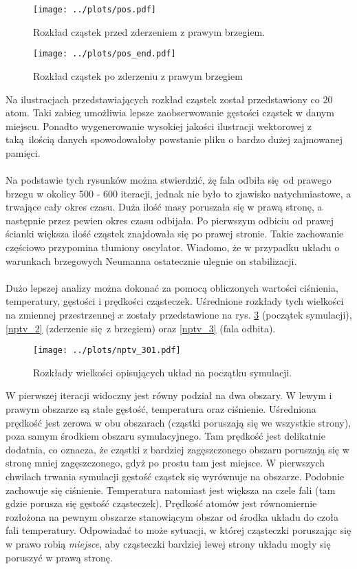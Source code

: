 \documentclass[a4paper, 12pt]{article}
\begin{document}
	\begin{figure}[H]
		\centering
		\texttt{[image: ../plots/pos.pdf]}
		\caption{Rozkład cząstek przed zderzeniem z prawym brzegiem.}
		\label{loc_1}
	\end{figure}
	
	\begin{figure}[H]
		\centering
		\texttt{[image: ../plots/pos\_end.pdf]}
		\caption{Rozkład cząstek po zderzeniu z prawym brzegiem}
		\label{loc_2}
	\end{figure}
	
	\noindent Na ilustracjach przedstawiających rozkład cząstek został przedstawiony co 20 atom. 
	Taki zabieg umożliwia lepsze zaobserwowanie gęstości cząstek w danym miejscu.
	Ponadto wygenerowanie wysokiej jakości ilustracji wektorowej z taką ilością danych spowodowałoby powstanie pliku o bardzo dużej zajmowanej pamięci.
	\\
	\\
	Na podstawie tych rysunków można stwierdzić, żę fala odbiła się od prawego brzegu w okolicy 500 - 600 iteracji, jednak nie było to zjawisko natychmiastowe, a trwające cały okres czasu.
	Duża ilość masy poruszała się w prawą stronę, a następnie przez pewien okres czasu odbijała.
	Po pierwszym odbiciu od prawej ścianki większa ilość cząstek znajdowała się po prawej stronie.
	Takie zachowanie częściowo przypomina tłumiony oscylator.
	Wiadomo, że w przypadku układu o warunkach brzegowych Neumanna ostatecznie ulegnie on stabilizacji.
	\\
	\\
	Dużo lepszej analizy można dokonać za pomocą obliczonych wartości ciśnienia, temperatury, gęstości i prędkości cząsteczek.
	Uśrednione rozkłady tych wielkości na zmiennej przestrzennej $x$ zostały przedstawione na rys. \ref{nptv_1} (początek symulacji), \ref{nptv_2} (zderzenie się z brzegiem) oraz \ref{nptv_3} (fala odbita).
	
	\begin{figure}[H]
		\centering
		\texttt{[image: ../plots/nptv\_301.pdf]}
		\caption{Rozkłady wielkości opisujących układ na początku symulacji.}
		\label{nptv_1}
	\end{figure}

	\noindent W pierwszej iteracji widoczny jest równy podział na dwa obszary.
	W lewym i prawym obszarze są stałe gęstość, temperatura oraz ciśnienie. 
	Uśredniona prędkość jest zerowa w obu obszarach (cząstki poruszają się we wszystkie strony), poza samym środkiem obszaru symulacyjnego. 
	Tam prędkość jest delikatnie dodatnia, co oznacza, że cząstki z bardziej zagęszczonego obszaru poruszają się w stronę mniej zagęszczonego, gdyż po prostu tam jest miejsce. 
	W pierwszych chwilach trwania symulacji gęstość cząstek się wyrównuje na obszarze. 
	Podobnie zachowuje się ciśnienie. 
	Temperatura natomiast jest większa na czele fali (tam gdzie porusza się gęstość cząsteczek). 
	Prędkość atomów jest równomiernie rozłożona na pewnym obszarze stanowiącym obszar od środka układu do czoła fali temperatury. 
	Odpowiadać to może sytuacji, w której cząsteczki poruszając się w prawo robią \textit{miejsce}, aby cząsteczki bardziej lewej strony układu mogły się poruszyć w  prawą stronę. 
\end{document}
